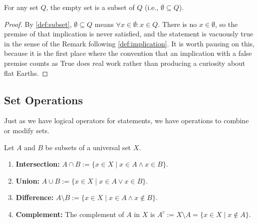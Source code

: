 \begin{claim*}
\label{claim:empty_set_is_subset}
For any set $Q$, the empty set is a subset of $Q$ (i.e., $\emptyset \subseteq Q$).
\end{claim*}

\begin{proof}
By \cref{def:subset}, $\emptyset \subseteq Q$ means $\forall x \in \emptyset : x \in Q$. There is no $x \in \emptyset$, so the premise of that implication is never satisfied, and the statement is vacuously true in the sense of the Remark following \cref{def:implication}. It is worth pausing on this, because it is the first place where the convention that an implication with a false premise counts as True does real work rather than producing a curiosity about flat Earths.
\end{proof}

\subsection{Set Operations}

Just as we have logical operators for statements, we have operations to combine or modify sets.

\begin{definition*}
\label{def:set_operations}
Let $A$ and $B$ be subsets of a universal set $X$.
\begin{enumerate}
    \item \textbf{Intersection:} $A \cap B := \{x \in X \mid x \in A \wedge x \in B\}$.
    \item \textbf{Union:} $A \cup B := \{x \in X \mid x \in A \vee x \in B\}$.
    \item \textbf{Difference:} $A \setminus B := \{x \in X \mid x \in A \wedge x \notin B\}$.
    \item \textbf{Complement:} The complement of $A$ in $X$ is $A^c := X \setminus A = \{x \in X \mid x \notin A\}$.
\end{enumerate}
\end{definition*}

